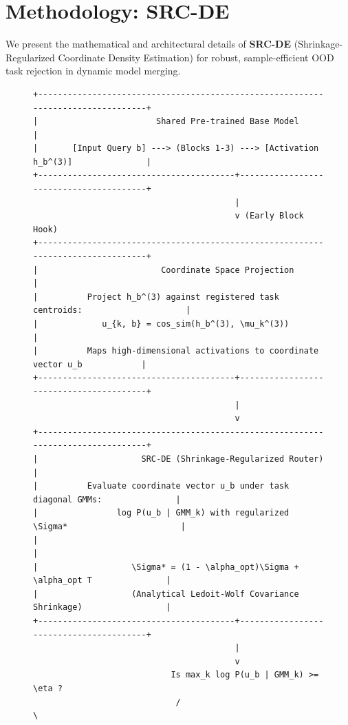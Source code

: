 \section{Methodology: SRC-DE}
\label{submission:sec:method}

We present the mathematical and architectural details of {\bf SRC-DE} (Shrinkage-Regularized Coordinate Density Estimation) for robust, sample-efficient OOD task rejection in dynamic model merging.

\begin{figure}[htbp]
\centering
\begin{small}
\begin{verbatim}
+---------------------------------------------------------------------------------+
|                        Shared Pre-trained Base Model                            |
|       [Input Query b] ---> (Blocks 1-3) ---> [Activation h_b^(3)]               |
+----------------------------------------+----------------------------------------+
                                         |
                                         v (Early Block Hook)
+---------------------------------------------------------------------------------+
|                         Coordinate Space Projection                             |
|          Project h_b^(3) against registered task centroids:                     |
|             u_{k, b} = cos_sim(h_b^(3), \mu_k^(3))                              |
|          Maps high-dimensional activations to coordinate vector u_b            |
+----------------------------------------+----------------------------------------+
                                         |
                                         v
+---------------------------------------------------------------------------------+
|                     SRC-DE (Shrinkage-Regularized Router)                       |
|          Evaluate coordinate vector u_b under task diagonal GMMs:               |
|                log P(u_b | GMM_k) with regularized \Sigma*                       |
|                                                                                 |
|                   \Sigma* = (1 - \alpha_opt)\Sigma + \alpha_opt T               |
|                   (Analytical Ledoit-Wolf Covariance Shrinkage)                 |
+----------------------------------------+----------------------------------------+
                                         |
                                         v
                            Is max_k log P(u_b | GMM_k) >= \eta ?
                             /                             \

\end{verbatim}
\end{small}
\end{figure}
